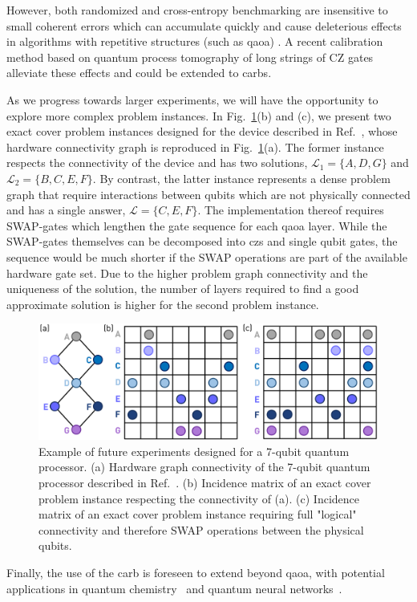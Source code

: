 However, both randomized and cross-entropy benchmarking are insensitive to small coherent errors which can accumulate quickly and cause deleterious effects in algorithms with repetitive structures (such as \gls{qaoa}) \cite{Kjaergaard2020AProcessor}. A recent calibration method based on quantum process tomography of long strings of CZ gates alleviate these effects \cite{Kjaergaard2020AProcessor} and could be extended to \glspl{carb}.

As we progress towards larger experiments, we will have the opportunity to explore more complex problem instances. In Fig.~\ref{fig:outlook_problem_instances}(b) and (c), we present two exact cover problem instances designed for the device described in Ref.~\cite{Andersen2019RepeatedCode}, whose hardware connectivity graph is reproduced in Fig.~\ref{fig:outlook_problem_instances}(a). The former instance respects the connectivity of the device and has two solutions, $\mathcal{L}_1 = \{A, D, G\}$ and  $\mathcal{L}_2 = \{B, C, E, F\}$. By contrast, the latter instance represents a dense problem graph that require interactions between qubits which are not physically connected and has a single answer, $\mathcal{L} = \{C, E, F\}$. The implementation thereof requires SWAP-gates which lengthen the gate sequence for each \gls{qaoa} layer. While the SWAP-gates themselves can be decomposed into \glspl{cz} and single qubit gates, the sequence would be much shorter if the SWAP operations are part of the available hardware gate set. Due to the higher problem graph connectivity and the uniqueness of the solution, the number of layers required to find a good approximate solution is higher for the second problem instance. 

\begin{figure}[ht]
    \centering
    \includegraphics[width=\textwidth]{outlook_problem_s7.pdf}
    \caption{Example of future experiments designed for a 7-qubit quantum processor. (a) Hardware graph connectivity of the 7-qubit quantum processor described in Ref.~\cite{Andersen2019RepeatedCode}. (b) Incidence matrix of an exact cover problem instance respecting the connectivity of (a). (c) Incidence matrix of an exact cover problem instance requiring full "logical" connectivity and therefore SWAP operations between the physical qubits. }
    \label{fig:outlook_problem_instances}
\end{figure}

Finally, the use of the \gls{carb} is foreseen to extend beyond \gls{qaoa}, with potential applications in quantum chemistry~\cite{Jiang2018QuantumFermions} and quantum neural networks~\cite{Cao2017QuantumComputers}.